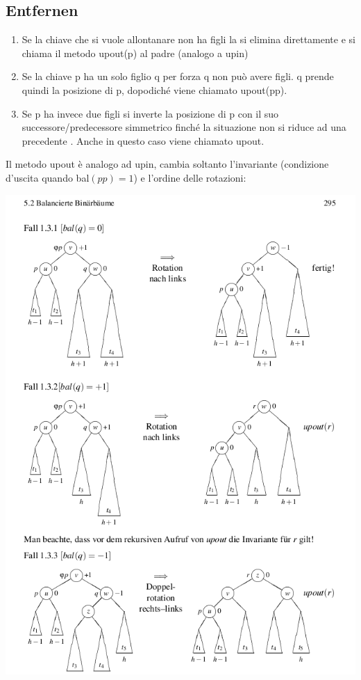 \documentclass[a4paper]{book}
\begin{document}
\subsection*{Entfernen}
\begin{enumerate}
\item Se la chiave che si vuole allontanare non ha figli la si elimina direttamente e si chiama il metodo upout(p) al padre (analogo a upin)
\item Se la chiave p ha un solo figlio q per forza q non può avere figli. q prende quindi la posizione di p, dopodiché viene chiamato upout(pp).
\item Se p ha invece due figli si inverte la posizione di p con il suo successore/predecessore simmetrico finché la situazione non si riduce ad una precedente . Anche in questo caso viene chiamato upout.
\end{enumerate}
Il metodo upout è analogo ad upin, cambia soltanto l'invariante (condizione d'uscita quando bal$(pp)=1$) e l'ordine delle rotazioni:
\begin{center}
\includegraphics[scale=0.5]{Figures/avldeletion.png}
\end{center}
\end{document}
